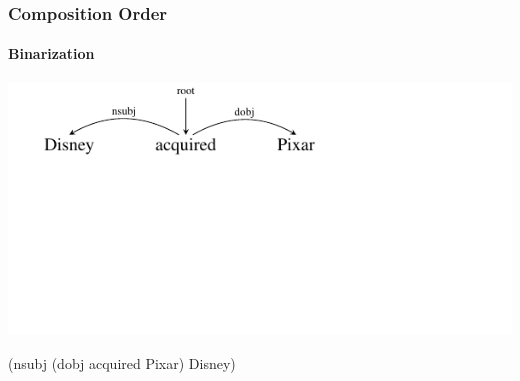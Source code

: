 \documentclass[mathserif,12pt]{beamer}
\begin{document}
\begin{frame}[noframenumbering]
\frametitle{Composition Order}
\framesubtitle{Binarization}
\begin{center}
\includegraphics[trim=2em 9.4em 10em 0em,clip=true,scale=1.3]{figures/pixar}

\vspace{3em}
(nsubj (dobj acquired Pixar) Disney)
\vspace{3em}

\end{center}
\end{frame}
\end{document}
